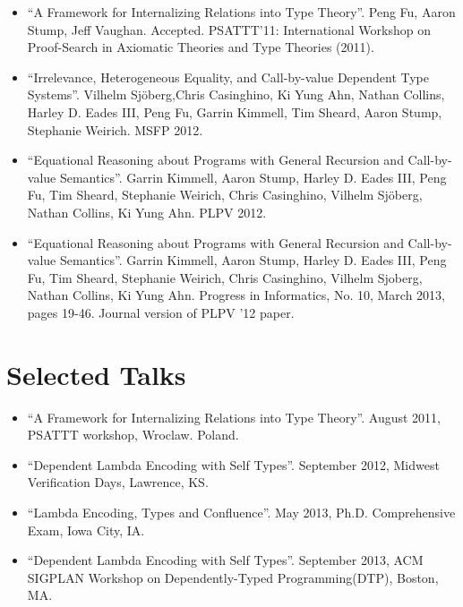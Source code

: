 \documentclass[10pt]{article}
\begin{document}
\begin{itemize}
\item ``A Framework for Internalizing Relations into Type Theory''. Peng Fu, Aaron Stump, Jeff Vaughan. Accepted. PSATTT'11: International Workshop on Proof-Search in Axiomatic Theories and Type Theories (2011).

  \item ``Irrelevance, Heterogeneous Equality, and Call-by-value Dependent Type Systems''. Vilhelm Sj\"oberg,Chris Casinghino, Ki Yung Ahn, Nathan Collins, Harley D. Eades III, Peng Fu, Garrin Kimmell, Tim Sheard, Aaron Stump, Stephanie Weirich. MSFP 2012.

\item ``Equational Reasoning about Programs with General Recursion and Call-by-value Semantics''. Garrin Kimmell, Aaron Stump, Harley D. Eades III, Peng Fu, Tim Sheard, Stephanie Weirich, Chris Casinghino, Vilhelm Sj\"oberg, Nathan Collins, Ki Yung Ahn. PLPV 2012. 
  
\item ``Equational Reasoning about Programs with General Recursion and Call-by-value Semantics''. Garrin Kimmell, Aaron Stump, Harley D. Eades III, Peng Fu, Tim Sheard, Stephanie Weirich, Chris Casinghino, Vilhelm Sjoberg, Nathan Collins, Ki Yung Ahn. Progress in Informatics, No. 10, March 2013, pages 19-46. Journal version of PLPV '12 paper. 
  
\end{itemize}

\section*{Selected Talks}

\begin{itemize}

\item ``A Framework for Internalizing Relations into Type Theory''. August 2011, PSATTT workshop, Wroclaw. Poland. 
\item ``Dependent Lambda Encoding with Self Types''. September 2012, Midwest Verification Days, Lawrence, KS.
\item ``Lambda Encoding, Types and Confluence''. May 2013, Ph.D. Comprehensive Exam, Iowa City, IA.
\item ``Dependent Lambda Encoding with Self Types''. September 2013, ACM SIGPLAN Workshop on Dependently-Typed Programming(DTP), Boston, MA.
\end{itemize}
\end{document}
